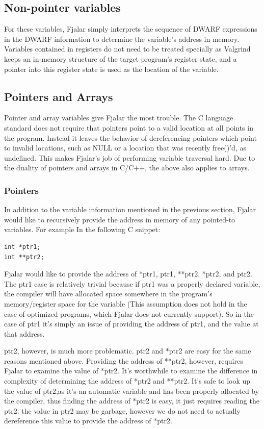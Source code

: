 \documentclass[11pt]{article}
\begin{document}
\subsection{Non-pointer variables}
For these variables, Fjalar simply interprets the sequence of DWARF
expressions in the DWARF information to determine the variable's
address in memory. Variables contained in registers do not need to be treated
specially as Valgrind keeps an in-memory structure of the target
program's register state, and a pointer into this register state is
used as the location of the variable.

\subsection{Pointers and Arrays}
Pointer and array variables give Fjalar the most trouble. The C
language standard does not require that pointers point to a valid
location at all points in the program. Instead it leaves the behavior
of dereferencing pointers which point to invalid locations, such as
NULL or a location that was recently free()'d, as
undefined. This makes Fjalar's job of performing variable traversal
hard. Due to the duality of pointers and arrays in C/C++, the above
also applies to arrays.

\subsubsection{Pointers}
In addition to the variable information mentioned in the previous
section, Fjalar would like to recursively provide the
address in memory of any pointed-to variables. For example In the
following C snippet:

\lstset{language=C, frame=single,}
\begin{lstlisting}
int *ptr1;
int **ptr2;
\end{lstlisting}

Fjalar would like to provide the address of *ptr1, ptr1, **ptr2,
*ptr2, and ptr2. The ptr1 case is relatively trivial because if ptr1
was a properly declared variable, the compiler will have allocated
space somewhere in the program's memory/register space for the
variable (This assumption does not hold in the case of optimized
programs, which Fjalar does not currently support). So in the case of
ptr1 it's simply an issue of providing the address of ptr1, and the
value at that address.

ptr2, however, is much more problematic. ptr2 and *ptr2 are easy for
the same reasons mentioned above. Providing the address of **ptr2,
however, requires Fjalar to examine the  value of *ptr2. It's worthwhile to examine the
difference in complexity of determining the address of *ptr2 and
**ptr2. It's safe to look up the value of ptr2,as it's an automatic variable and has been properly
allocated by the compiler, thus finding the address of *ptr2 is easy,
it just requires reading the ptr2. the value
in ptr2 may be garbage, however we do not need to actually
dereference this value to provide the address of *ptr2.
\end{document}
